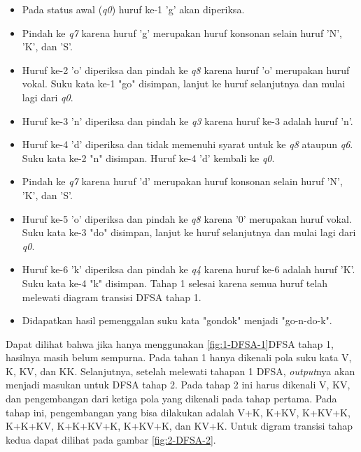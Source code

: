 \begin{itemize}
	\item Pada status awal (\textit{q0}) huruf ke-1 'g' akan diperiksa.
	\item Pindah ke \textit{q7} karena huruf 'g' merupakan huruf konsonan selain huruf 'N', 'K', dan 'S'.
	\item Huruf ke-2 'o' diperiksa dan pindah ke \textit{q8} karena huruf 'o' merupakan huruf vokal. Suku kata ke-1 "go" disimpan, lanjut ke huruf selanjutnya dan mulai lagi dari \textit{q0}.
	\item Huruf ke-3 'n' diperiksa dan pindah ke \textit{q3} karena huruf ke-3 adalah huruf 'n'.
	\item Huruf ke-4 'd' diperiksa dan tidak memenuhi syarat untuk ke \textit{q8} ataupun \textit{q6}. Suku kata ke-2 "n" disimpan. Huruf ke-4 'd' kembali ke \textit{q0}.
	\item Pindah ke \textit{q7} karena huruf 'd' merupakan huruf konsonan selain huruf 'N', 'K', dan 'S'.
	\item Huruf ke-5 'o' diperiksa dan pindah ke \textit{q8} karena '0' merupakan huruf vokal. Suku kata ke-3 "do" disimpan, lanjut ke huruf selanjutnya dan mulai lagi dari \textit{q0}.
	\item Huruf ke-6 'k' diperiksa dan pindah ke \textit{q4} karena huruf ke-6 adalah huruf 'K'. Suku kata ke-4 "k" disimpan. Tahap 1 selesai karena semua huruf telah melewati diagram transisi DFSA tahap 1.
	\item Didapatkan hasil pemenggalan suku kata "gondok" menjadi "go-n-do-k".
\end{itemize}

Dapat dilihat bahwa jika hanya menggunakan \ref{fig:1-DFSA-1}DFSA tahap 1, hasilnya masih belum sempurna. Pada tahan 1 hanya dikenali pola suku kata V, K, KV, dan KK. Selanjutnya, setelah melewati tahapan 1 DFSA, \textit{output}nya akan menjadi masukan untuk DFSA tahap 2. Pada tahap 2 ini harus dikenali V, KV, dan pengembangan dari ketiga pola yang dikenali pada tahap pertama. Pada tahap ini, pengembangan yang bisa dilakukan adalah V+K, K+KV, K+KV+K, K+K+KV, K+K+KV+K, K+KV+K, dan KV+K. Untuk digram transisi tahap kedua dapat dilihat pada gambar \ref{fig:2-DFSA-2}.

